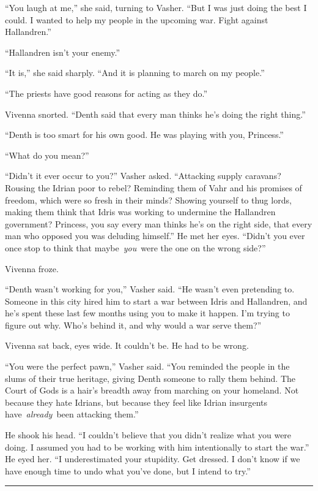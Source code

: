 “You laugh at me,” she said, turning to Vasher. “But I was just doing the best I could. I wanted to help my people in the upcoming war. Fight against Hallandren.”

“Hallandren isn’t your enemy.”

“It is,” she said sharply. “And it is planning to march on my people.”

“The priests have good reasons for acting as they do.”

Vivenna snorted. “Denth said that every man thinks he’s doing the right thing.”

“Denth is too smart for his own good. He was playing with you, Princess.”

“What do you mean?”

“Didn’t it ever occur to you?” Vasher asked. “Attacking supply caravans? Rousing the Idrian poor to rebel? Reminding them of Vahr and his promises of freedom, which were so fresh in their minds? Showing yourself to thug lords, making them think that Idris was working to undermine the Hallandren government? Princess, you say every man thinks he’s on the right side, that every man who opposed you was deluding himself.” He met her eyes. “Didn’t you ever once stop to think that maybe~\textit{you}~were the one on the wrong side?”

Vivenna froze.

“Denth wasn’t working for you,” Vasher said. “He wasn’t even pretending to. Someone in this city hired him to start a war between Idris and Hallandren, and he’s spent these last few months using you to make it happen. I’m trying to figure out why. Who’s behind it, and why would a war serve them?”

Vivenna sat back, eyes wide. It couldn’t be. He had to be wrong.

“You were the perfect pawn,” Vasher said. “You reminded the people in the slums of their true heritage, giving Denth someone to rally them behind. The Court of Gods is a hair’s breadth away from marching on your homeland. Not because they hate Idrians, but because they feel like Idrian insurgents have~\textit{already}~been attacking them.”

He shook his head. “I couldn’t believe that you didn’t realize what you were doing. I assumed you had to be working with him intentionally to start the war.” He eyed her. “I underestimated your stupidity. Get dressed. I don’t know if we have enough time to undo what you’ve done, but I intend to try.”

\bigskip \hrule \bigskip

